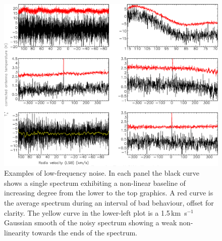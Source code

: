 \documentclass[a4paper,fleqn,usenatbib]{mnras}
\begin{document}
\begin{figure}
\includegraphics[width=\textwidth]{examples_non-linear_baselines}
\caption{Examples of low-frequency noise.  In each panel the
  black curve shows a single spectrum exhibiting a non-linear baseline
  of increasing degree from the lower to the top graphics.  A red curve
  is the average spectrum during an interval of bad behaviour, offset
  for clarity.  The yellow curve in the lower-left plot is a
  1.5\,km~s$^{-1}$ Gaussian smooth of the noisy spectrum showing a
  weak non-linearity towards the ends of the spectrum.}
\label{fig:badbase:interference}
\end{figure}
\end{document}
